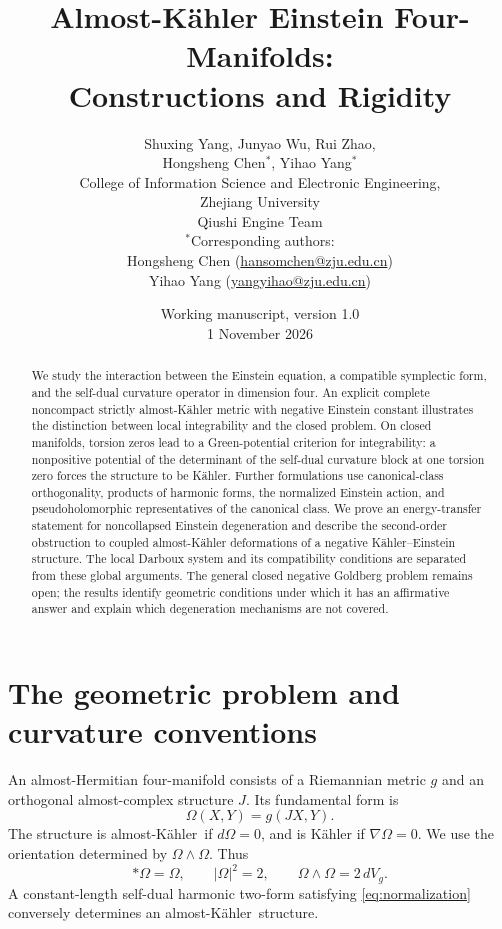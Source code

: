 \documentclass[11pt,a4paper]{article}
\title{Almost-K\"ahler Einstein Four-Manifolds:\\Constructions and Rigidity}
\author{\normalsize Shuxing Yang, Junyao Wu, Rui Zhao,\\[3pt]
\normalsize Hongsheng Chen$^{*}$, Yihao Yang$^{*}$\\[9pt]
\small College of Information Science and Electronic Engineering,\\
\small Zhejiang University\\
\small Qiushi Engine Team\\[8pt]
\footnotesize $^{*}$Corresponding authors:\\
\footnotesize Hongsheng Chen (\href{mailto:hansomchen@zju.edu.cn}{hansomchen@zju.edu.cn})\\
\footnotesize Yihao Yang (\href{mailto:yangyihao@zju.edu.cn}{yangyihao@zju.edu.cn})}
\date{\small Working manuscript, version 1.0\\1 November 2026}
\theoremstyle{definition}
\theoremstyle{remark}
\newcommand{\AK}{almost-K\"ahler}
\begin{document}
\maketitle
\begin{abstract}
We study the interaction between the Einstein equation, a compatible symplectic form, and the self-dual curvature operator in dimension four. An explicit complete noncompact strictly almost-K\"ahler metric with negative Einstein constant illustrates the distinction between local integrability and the closed problem. On closed manifolds, torsion zeros lead to a Green-potential criterion for integrability: a nonpositive potential of the determinant of the self-dual curvature block at one torsion zero forces the structure to be K\"ahler. Further formulations use canonical-class orthogonality, products of harmonic forms, the normalized Einstein action, and pseudoholomorphic representatives of the canonical class. We prove an energy-transfer statement for noncollapsed Einstein degeneration and describe the second-order obstruction to coupled almost-K\"ahler deformations of a negative K\"ahler--Einstein structure. The local Darboux system and its compatibility conditions are separated from these global arguments. The general closed negative Goldberg problem remains open; the results identify geometric conditions under which it has an affirmative answer and explain which degeneration mechanisms are not covered.
\end{abstract}
\tableofcontents

\section{The geometric problem and curvature conventions}
An almost-Hermitian four-manifold consists of a Riemannian metric $g$ and an orthogonal almost-complex structure $J$. Its fundamental form is
\[
 \Omega(X,Y)=g(JX,Y).
\]
The structure is \AK\ if $d\Omega=0$, and is K\"ahler if $\nabla\Omega=0$. We use the orientation determined by $\Omega\wedge\Omega$. Thus
\begin{equation}\label{eq:normalization}
 *\Omega=\Omega,\qquad |\Omega|^2=2,\qquad \Omega\wedge\Omega=2\,dV_g.
\end{equation}
A constant-length self-dual harmonic two-form satisfying \eqref{eq:normalization} conversely determines an \AK\ structure.
\end{document}
